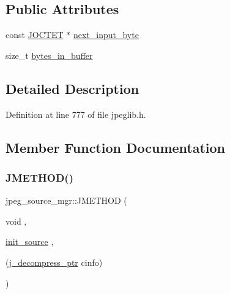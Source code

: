 \subsection*{Public Attributes}
\begin{DoxyCompactItemize}
\item 
const \mbox{\hyperlink{jmorecfg_8h_a356ad249f20e691b520da439f92cccbc}{J\+O\+C\+T\+ET}} $\ast$ \mbox{\hyperlink{structjpeg__source__mgr_aad884e7f4ba7496ab0f56c942c7585c1}{next\+\_\+input\+\_\+byte}}
\item 
size\+\_\+t \mbox{\hyperlink{structjpeg__source__mgr_a8ecb72557c1c9666d77fffea074282a4}{bytes\+\_\+in\+\_\+buffer}}
\end{DoxyCompactItemize}


\subsection{Detailed Description}


Definition at line 777 of file jpeglib.\+h.



\subsection{Member Function Documentation}
\mbox{\label{structjpeg__source__mgr_af8fda02c19c9dc4e505daabb77c3ad81}} 
\subsubsection{\texorpdfstring{JMETHOD()}{JMETHOD()}\hspace{0.1cm}{\footnotesize\ttfamily [1/5]}}
{\footnotesize\ttfamily jpeg\+\_\+source\+\_\+mgr\+::\+J\+M\+E\+T\+H\+OD (\begin{DoxyParamCaption}\item[{void}]{,  }\item[{\mbox{\hyperlink{jdatasrc_8c_ada3118e56d083499ce141e98ec116648}{init\+\_\+source}}}]{,  }\item[{(\mbox{\hyperlink{jpeglib_8h_a00c7d78af44bd26a901c791ccfc1e178}{j\+\_\+decompress\+\_\+ptr}} cinfo)}]{ }\end{DoxyParamCaption})}

\mbox{\label{structjpeg__source__mgr_ab4a579b1f50108e2de73c7c0c1bbb9fd}} 
